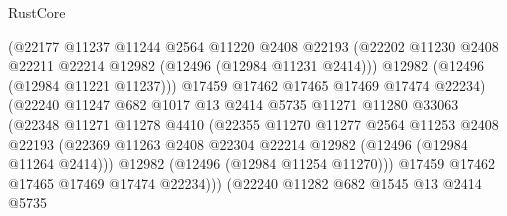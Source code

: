\begin{lexlean}{RustCore}
\begin{coremodule}
                              (@22177
                                @11237
                                @11244
                                @2564
                                @11220
                                @2408
                                @22193
                                (@22202
                                  @11230
                                  @2408
                                  @22211
                                  @22214
                                  @12982
                                  (@12496 (@12984 @11231 @2414)))
                                @12982
                                (@12496 (@12984 @11221 @11237)))
                              @17459
                              @17462
                              @17465
                              @17469
                              @17474
                              @22234)
                            (@22240
                              @11247
                              @682
                              @1017
                              @13
                              @2414
                              @5735
                              @11271
                              @11280
                              @33063
                              (@22348
                                @11271
                                @11278
                                @4410
                                (@22355
                                  @11270
                                  @11277
                                  @2564
                                  @11253
                                  @2408
                                  @22193
                                  (@22369
                                    @11263
                                    @2408
                                    @22304
                                    @22214
                                    @12982
                                    (@12496 (@12984 @11264 @2414)))
                                  @12982
                                  (@12496 (@12984 @11254 @11270)))
                                @17459
                                @17462
                                @17465
                                @17469
                                @17474
                                @22234)))
                          (@22240
                            @11282
                            @682
                            @1545
                            @13
                            @2414
                            @5735

\end{coremodule}
\end{lexlean}
